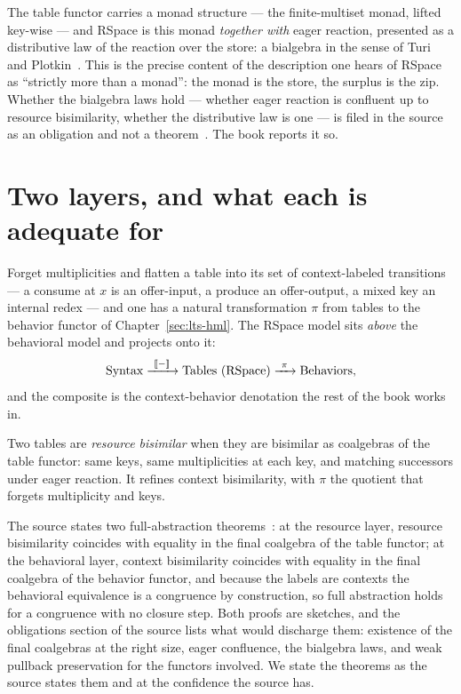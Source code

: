 \begin{remark}
\label{rs:rmk:bialgebra}
The table functor carries a monad structure --- the finite-multiset monad, lifted key-wise
--- and RSpace is this monad \emph{together with} eager reaction, presented as a
distributive law of the reaction over the store: a bialgebra in the sense of Turi and
Plotkin~\cite{turiplotkin}. This is the precise content of the description one hears of
RSpace as ``strictly more than a monad'': the monad is the store, the surplus is the zip.
Whether the bialgebra laws hold --- whether eager reaction is confluent up to resource
bisimilarity, whether the distributive law is one --- is filed in the source as an
obligation and not a theorem~\cite[\S8]{qcs}. The book reports it so.
\end{remark}

\section{Two layers, and what each is adequate for}
\label{rs:sec:layers}

Forget multiplicities and flatten a table into its set of context-labeled transitions ---
a consume at $x$ is an offer-input, a produce an offer-output, a mixed key an internal
redex --- and one has a natural transformation $\pi$ from tables to the behavior functor
of Chapter~\ref{sec:lts-hml}. The RSpace model sits \emph{above} the behavioral model and
projects onto it:
\[
  \text{Syntax} \xrightarrow{\ \llbracket - \rrbracket\ } \text{Tables (RSpace)}
                \xrightarrow{\ \pi\ } \text{Behaviors},
\]
and the composite is the context-behavior denotation the rest of the book works in.

\begin{definition}
\label{rs:def:resbis}
Two tables are \emph{resource bisimilar} when they are bisimilar as coalgebras of the
table functor: same keys, same multiplicities at each key, and matching successors under
eager reaction. It refines context bisimilarity, with $\pi$ the quotient that forgets
multiplicity and keys.
\end{definition}

The source states two full-abstraction theorems~\cite{qcs}: at the resource layer,
resource bisimilarity coincides with equality in the final coalgebra of the table functor;
at the behavioral layer, context bisimilarity coincides with equality in the final
coalgebra of the behavior functor, and because the labels are contexts the behavioral
equivalence is a congruence by construction, so full abstraction holds for a congruence
with no closure step. Both proofs are sketches, and the obligations section of the source
lists what would discharge them: existence of the final coalgebras at the right size,
eager confluence, the bialgebra laws, and weak pullback preservation for the functors
involved. We state the theorems as the source states them and at the confidence the source
has.


